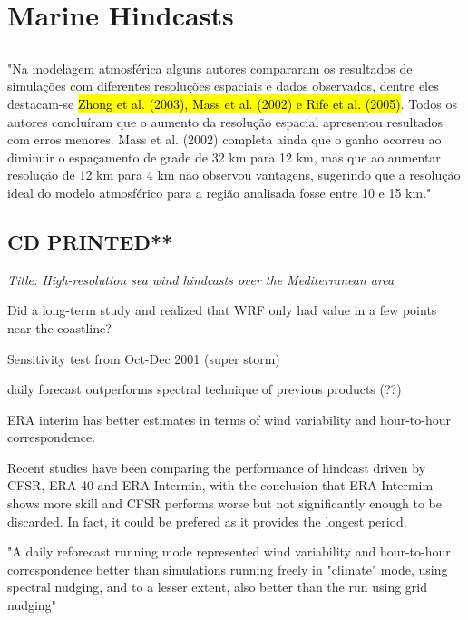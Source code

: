 \documentclass[12pt,a4paper]{article}
\begin{document}
\section{Marine Hindcasts}

\subsection{\cite{Lewis2017}}


"Na modelagem atmosférica alguns autores compararam os resultados de simulações com diferentes resoluções espaciais e dados observados, dentre eles destacam-se \hl{Zhong et al. (2003), Mass et al. (2002) e Rife et al. (2005)}. Todos os autores concluíram que o aumento da resolução espacial apresentou resultados com erros menores. Mass et al. (2002) completa ainda que o ganho ocorreu ao diminuir o espaçamento de grade de 32 km para 12 km, mas que ao aumentar resolução de 12 km para 4 km não observou vantagens, sugerindo que a resolução ideal do modelo atmosférico para a região analisada fosse entre 10 e 15 km."


\subsection{\cite{Menendez2014a} CD PRINTED**}

\textit{Title: High-resolution sea wind hindcasts over the Mediterranean area}

Did a long-term study and realized that WRF only had value in a few points near the coastline?

Sensitivity test from Oct-Dec 2001 (super storm)

daily forecast outperforms spectral technique of previous products (??)

ERA interim has better estimates in terms of wind variability and hour-to-hour correspondence. 

Recent studies have been comparing the performance of hindcast driven by \gls{CFSR}, ERA-40 and ERA-Intermin, with the conclusion that ERA-Intermim shows more skill and \gls{CFSR} performs worse but not significantly enough to be discarded. In fact, it could be prefered as it provides the longest period. 

"A daily reforecast running mode represented wind variability and hour-to-hour correspondence better than simulations running freely in "climate" mode, using spectral nudging, and to a lesser extent, also better than the run using grid nudging"
\end{document}
